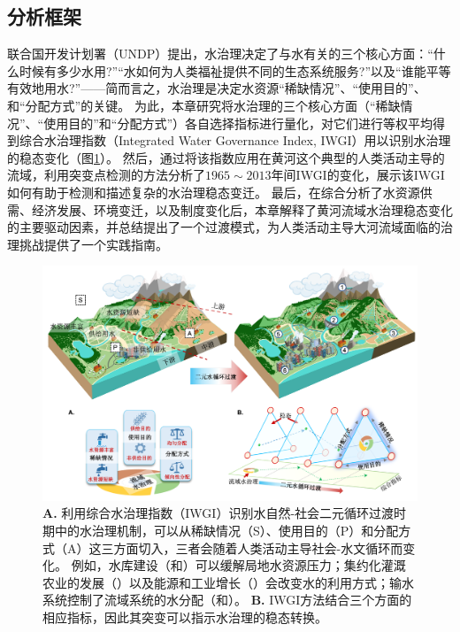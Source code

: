 
\subsection{分析框架}

联合国开发计划署（UNDP）提出\cite{undpwatergovernancefacility2016}，水治理决定了与水有关的三个核心方面：“什么时候有多少水用?”“水如何为人类福祉提供不同的生态系统服务?”以及“谁能平等有效地用水?”——简而言之，水治理是决定水资源“稀缺情况”、“使用目的”、和“分配方式”的关键。
为此，本章研究将水治理的三个核心方面（“稀缺情况”、“使用目的”和“分配方式”）各自选择指标进行量化，对它们进行等权平均得到综合水治理指数（Integrated Water Governance Index, IWGI）用以识别水治理的稳态变化（图\ref{ch4:fig:framework}）。
然后，通过将该指数应用在黄河这个典型的人类活动主导的流域，利用突变点检测的方法分析了$1965\sim2013$年间IWGI的变化，展示该IWGI如何有助于检测和描述复杂的水治理稳态变迁。
最后，在综合分析了水资源供需、经济发展、环境变迁，以及制度变化后，本章解释了黄河流域水治理稳态变化的主要驱动因素，并总结提出了一个过渡模式，为人类活动主导大河流域面临的治理挑战提供了一个实践指南。

\begin{figure}[!ht]
\centering
\includegraphics[width=\textwidth]{img/ch4/ch4_framework.png}
\caption[定量识别流域水治理转变的分析框架]{
    \textbf{A.} 利用综合水治理指数（IWGI）识别水自然-社会二元循环过渡时期中的水治理机制，可以从稀缺情况（S）、使用目的（P）和分配方式（A）这三方面切入，三者会随着人类活动主导社会-水文循环而变化。
    例如，水库建设（和）可以缓解局地水资源压力；集约化灌溉农业的发展（）以及能源和工业增长（）会改变水的利用方式；输水系统控制了流域系统的水分配（和）。
    \textbf{B.} IWGI方法结合三个方面的相应指标，因此其突变可以指示水治理的稳态转换。}\label{ch4:fig:framework}
\end{figure}

